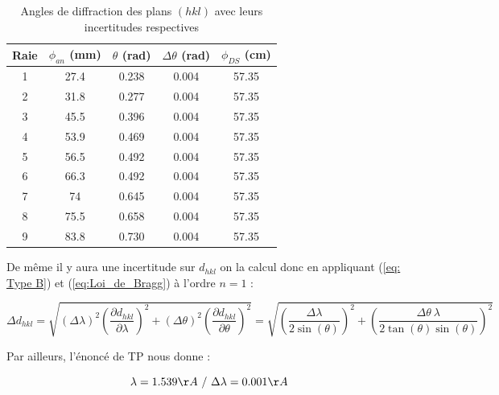 \begin{table}[h!]
	\centering
	\begin{tabular}{|c|c|c|c|c|}
		
		\hline
Raie	&	$\phi_{an}$ (mm) & $\theta $ (rad)	 & $\Delta \theta$ (rad) & $\phi_{DS}$ (cm) \\ \hline
1 &	27.4	&           0.238          &    0.004    & 57.35\\ \hline
2 &	31.8	&        0.277              &   0.004     & 57.35\\ \hline
3 &	45.5	&          0.396           &    0.004   & 57.35 \\ \hline
4 &	53.9	&          0.469            &  0.004      & 57.35\\ \hline
 5 &	56.5	&      0.492                 &   0.004   &57.35  \\ \hline
6&	66.3	&            0.492          &     0.004	  & 57.35\\ \hline
7&	74	&               0.645        &     0.004   & 57.35\\ \hline
8&	75.5	&           0.658           &   0.004    & 57.35 \\ \hline
9&	83.8	&            0.730          &   0.004    & 57.35 \\ \hline
	\end{tabular}
	\caption{Angles de diffraction des plans $(h k l)$ avec leurs incertitudes respectives
	 }
	\label{tab:Tableau des angles correspondant aux diffrentes raies en fonction de phi DS}
\end{table}

De même il y aura une incertitude sur $d_{hkl}$ on la calcul donc en appliquant (\ref{eq: Type B}) et (\ref{eq:Loi_de_Bragg}) à l'ordre $n =1$ :

\begin{equation} \label{eq: Type B dhkl}
\Delta d_{hkl} = \sqrt{\left ( \Delta \lambda \right )^2 \left ( \frac{\partial d_{hkl}}{\partial \lambda} \right )^2 + \left (\Delta \theta \right )^2 \left ( \frac{\partial d_{hkl} }{\partial \theta} \right )^2} = \sqrt{  \left ( \frac{\Delta \lambda}{2\sin(\theta)} \right )^2 + \left ( \frac{\Delta \theta \ \lambda}{2 \tan(\theta) \sin(\theta)} \right )^2 } 
\end{equation}

Par ailleurs, l'énoncé de TP nous donne		 :

\begin{equation}
	\lambda = 1.539 \AA \ / \ \Delta \lambda = 0.001 \AA
\end{equation}

